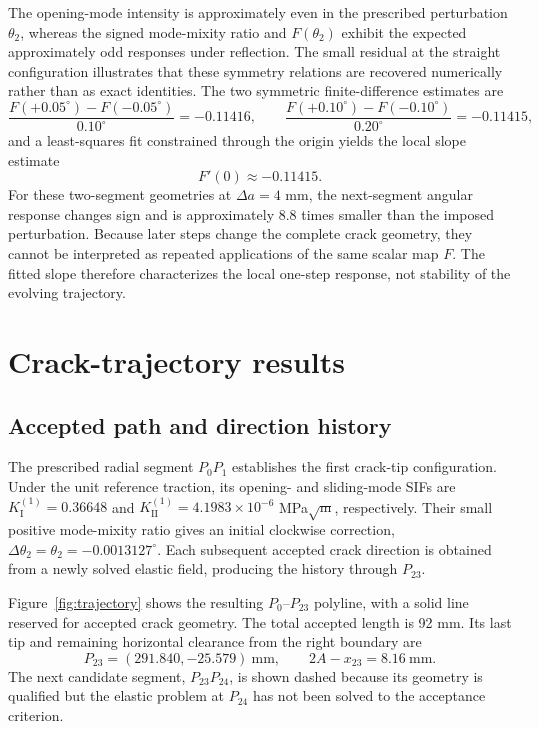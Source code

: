 \documentclass[pdflatex,sn-mathphys-num]{sn-jnl}
\newcommand{\LastXMM}{291.840}
\newcommand{\LastYMM}{-25.579}
\newcommand{\LastLigamentMM}{8.16}
\begin{document}
The opening-mode intensity is approximately even in the
prescribed perturbation $\theta_2$, whereas the signed mode-mixity
ratio and $F(\theta_2)$ exhibit the expected approximately odd
responses under reflection. The small residual at the straight
configuration illustrates that these symmetry relations are
recovered numerically rather than as exact identities.
The two symmetric finite-difference estimates are
\[
 \frac{F(+0.05^\circ)-F(-0.05^\circ)}{0.10^\circ}
 =-0.11416,
 \qquad
 \frac{F(+0.10^\circ)-F(-0.10^\circ)}{0.20^\circ}
 =-0.11415,
\]
and a least-squares fit constrained through the origin yields the local
slope estimate
\begin{equation}
 F'(0)\approx-0.11415.
 \label{eq:symmetric-multiplier}
\end{equation}
For these two-segment geometries at $\Delta a=4$ mm,
the next-segment angular response changes sign and is
approximately 8.8 times smaller than the imposed perturbation.
Because later steps change the complete crack geometry,
they cannot be interpreted as repeated applications of
the same scalar map $F$. The fitted slope therefore
characterizes the local one-step response, not stability
of the evolving trajectory.

\section{Crack-trajectory results}
\label{sec:results}
\subsection{Accepted path and direction history}
The prescribed radial segment $P_0P_1$ establishes the first
crack-tip configuration. Under the unit reference traction, its
opening- and sliding-mode SIFs are
$K_{\mathrm{I}}^{(1)}=0.36648$ and
$K_{\mathrm{II}}^{(1)}=4.1983\times10^{-6}$ MPa$\sqrt{\mathrm m}$,
respectively. Their small positive mode-mixity ratio gives an
initial clockwise correction,
$\Delta\theta_2=\theta_2=-0.0013127^\circ$.
Each subsequent accepted crack direction is obtained from a newly
solved elastic field, producing the history through $P_{23}$.

Figure~\ref{fig:trajectory} shows the resulting $P_0$--$P_{23}$
polyline, with a solid line reserved for accepted crack geometry.
The total accepted length is 92 mm. Its last tip and remaining
horizontal clearance from the right boundary are
\begin{equation}
 P_{23}=(\LastXMM,\LastYMM)\ \mathrm{mm},\qquad
 2A-x_{23}=\LastLigamentMM\ \mathrm{mm}.
\end{equation}
The next candidate segment, $P_{23}P_{24}$, is shown dashed
because its geometry is qualified but the elastic problem at
$P_{24}$ has not been solved to the acceptance criterion.
\end{document}
